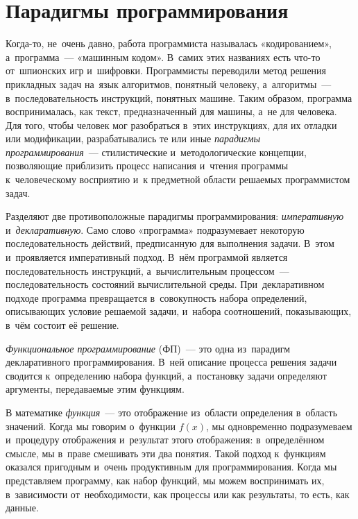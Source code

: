 
\section{Парадигмы программирования}%
Когда-то, не~очень давно, работа программиста называлась «кодированием», а~программа~--- «машинным кодом». В~самих этих названиях есть что-то от~шпионских игр и~шифровки. Программисты переводили метод решения прикладных задач на~язык алгоритмов, понятный человеку, а~алгоритмы~--- в~последовательность инструкций, понятных машине. Таким образом, программа воспринималась, как текст, предназначенный для машины, а~не для человека. Для того, чтобы человек мог разобраться в~этих инструкциях, для их отладки или модификации, разрабатывались те или иные \emph{парадигмы программирования}~--- стилистические и~методологические концепции, позволяющие приблизить процесс написания и~чтения программы к~человеческому восприятию и~к предметной области решаемых программистом задач.

Разделяют две противоположные парадигмы программирования: \emph{императивную} и~\emph{декларативную}. Само слово «программа» подразумевает некоторую последовательность действий, предписанную для выполнения задачи. В~этом и~проявляется императивный подход. В~нём программой является последовательность инструкций, а~вычислительным процессом~--- последовательность состояний вычислительной среды. При~декларативном подходе программа превращается в~совокупность набора определений, описывающих условие решаемой задачи, и~набора соотношений, показывающих, в~чём состоит её решение.

\emph{Функциональное программирование} (ФП)~--- это одна из~парадигм декларативного программирования. В~ней описание процесса решения задачи сводится к~определению набора функций, а~постановку задачи определяют аргументы, передаваемые этим \mbox{функциям}.

В математике \emph{функция}~--- это отображение из~области определения в~область значений. Когда мы говорим о~функции $f(x)$, мы одновременно подразумеваем и~процедуру отображения и~результат этого отображения: в~определённом смысле, мы в~праве смешивать эти два понятия. Такой подход к~функциям оказался пригодным и~очень продуктивным для программирования. Когда мы представляем программу, как набор функций, мы можем воспринимать их, в~зависимости от~необходимости, как процессы или как результаты, то есть, как данные.

